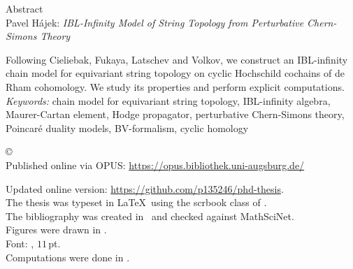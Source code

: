 \documentclass[\MainFolder/Text.tex]{subfiles}
\begin{document}
\begin{center}
  {\LARGE Abstract}\\[0.5cm]
  Pavel H\'ajek: {\itshape IBL-Infinity Model of String Topology from Perturbative Chern-Simons Theory}
\end{center}

Following Cieliebak, Fukaya, Latschev and Volkov, we construct an IBL-infinity chain model for equivariant string topology on cyclic Hochschild cochains of de Rham cohomology. We study its properties and perform explicit computations.\vspace{.8cm}\\
\noindent \emph{Keywords:} chain model for equivariant string topology, IBL-infinity algebra, Maurer-Cartan element, Hodge propagator, perturbative Chern-Simons theory, Poincar\'e duality models, BV-formalism, cyclic homology
\clearpage 
{\null\vfill
\begin{flushleft}
\makeatletter
\copyright\ \the\year\ \@author
\makeatother \\[\baselineskip]

Published online via OPUS:  \url{https://opus.bibliothek.uni-augsburg.de/}

Updated online version: \url{https://github.com/p135246/phd-thesis}.\\[\baselineskip]

The thesis was typeset in \LaTeX\ using the \textsf{scrbook} class of \Komaname. \\
The bibliography was created in \Biblatexname\ and checked against \textsf{MathSciNet}. \\
Figures were drawn in \Tikzname.\\
Font: \Libertinename, $11$\,pt.\\
Computations were done in \Mathematicaname.\\[\baselineskip]
\end{flushleft}
}
\end{document}
